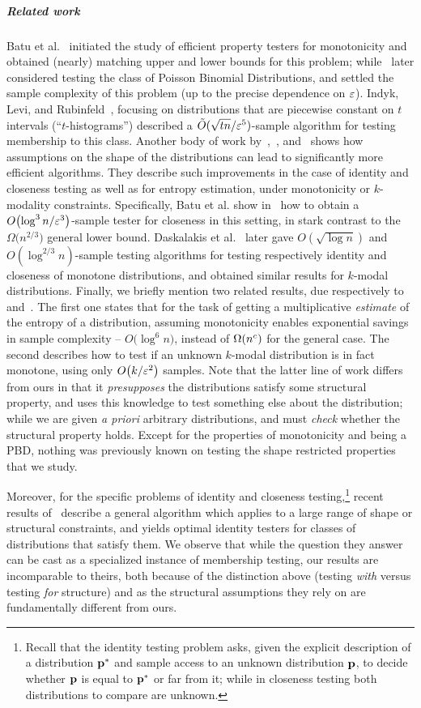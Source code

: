 \subparagraph{Related work} Batu et al.~\cite{BKR:04} initiated the study of efficient property testers for monotonicity and obtained (nearly) matching upper and lower bounds for this problem; while~\cite{AD:15} later considered testing the class of Poisson Binomial Distributions, and settled the sample complexity of this problem (up to the precise dependence on $\varepsilon$). Indyk, Levi, and Rubinfeld~\cite{ILR:12}, focusing on distributions that are piecewise constant on $t$ intervals (``$t$-histograms'') described a $\tilde{O}(\sqrt{tn}/\varepsilon^5)$-sample algorithm for testing membership to this class. Another body of work by~\cite{BDKR:05},~\cite{BKR:04}, and~\cite{DDSVV:13} shows how assumptions on the shape of the distributions can lead to significantly more efficient algorithms. They describe such improvements in the case of identity and closeness testing as well as for entropy estimation, under monotonicity or $k$-modality constraints. Specifically, Batu et al. show in~\cite{BKR:04} how to obtain a $O\big({\log^3 n/\varepsilon^3}\big)$-sample tester for closeness in this setting, in stark contrast to the $\Omega\big({{n}^{2/3}}\big)$ general lower bound. Daskalakis et al.~\cite{DDSVV:13} later gave ${O}(\sqrt{\log n})$ and ${O}({\log^{2/3} n})$-sample testing algorithms for testing respectively identity and closeness of monotone distributions, and obtained similar results for $k$-modal distributions. Finally, we briefly mention two related results, due respectively to~\cite{BDKR:05} and~\cite{DDS:12}. The first one states that for the task of getting a multiplicative \emph{estimate} of the entropy of a distribution, assuming monotonicity enables exponential savings in sample complexity -- $O\big({\log^6 n}\big)$, instead of $\bigOmega{n^c}$ for the general case. The second describes how to test if an unknown $k$-modal distribution is in fact monotone, using only $\bigO{k/\eps^2}$ samples. Note that the latter line of work differs from ours in that it \emph{presupposes} the distributions satisfy some structural property, and uses this knowledge to test something else about the distribution; while we are given \textit{a priori} arbitrary distributions, and must \emph{check} whether the structural property holds. Except for the properties of monotonicity and being a PBD, nothing was previously known on testing the shape restricted properties that we study.

Moreover, for the specific problems of identity and closeness testing,\footnote{Recall that the identity testing problem asks, given the explicit description of a distribution $\mathbf{p}^\ast$ and sample access to an unknown distribution $\mathbf{p}$, to decide whether $\mathbf{p}$ is equal to $\mathbf{p}^\ast$ or far from it; while in closeness testing both distributions to compare are unknown.} recent results of~\cite{DKN:15,DKN:15:FOCS} describe a general algorithm which applies to a large range of shape or structural constraints, and yields optimal identity testers for classes of distributions that satisfy them. We observe that while the question they answer can be cast as a specialized instance of membership testing, our results are incomparable to theirs, both because of the distinction above (testing \emph{with} versus testing \emph{for} structure) and as the structural assumptions they rely on are fundamentally different from ours.

